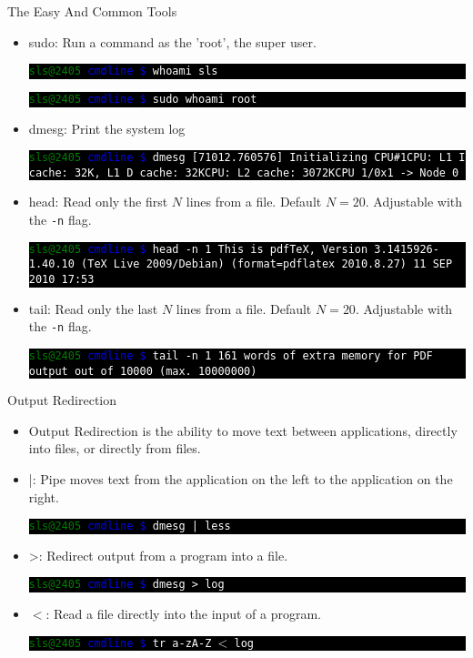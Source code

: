 \documentclass[10pt]{beamer}
\makeatletter
\newcommand{\codeblock}[1]
{
  \colorbox{black}{
    \begin{minipage}{\linewidth}
      \texttt{\textcolor{green}{sls@2405} \textcolor{blue}{cmdline \$} \textcolor{white}{#1}}
    \end{minipage}
  }
}
\newcommand{\codeblockWO}[2]
{
  \colorbox{black}{
    \begin{minipage}{\linewidth}
      \texttt{\textcolor{green}{sls@2405} \textcolor{blue}{cmdline \$} \textcolor{white}{#1}
      \newline
      \textcolor{white}{#2}}
    \end{minipage}
  }
}
\makeatother
\begin{document}
\begin{frame}[allowframebreaks]{The Easy And Common Tools}
\begin{itemize}
\item sudo: Run a command as the 'root', the super user.
\codeblockWO{whoami}{sls}
\codeblockWO{sudo whoami}{root}

\item dmesg: Print the system log
\codeblockWO{dmesg}{[71012.760576] Initializing CPU\#1\newline
[71012.760576] CPU: L1 I cache: 32K, L1 D cache: 32K\newline
[71012.760576] CPU: L2 cache: 3072K\newline
[71012.760576] CPU 1/0x1 -> Node 0}

\item head: Read only the first $N$ lines from a file. Default $N=20$. Adjustable with the \texttt{-n} flag.
\codeblockWO{head -n 1}{This is pdfTeX, Version 3.1415926-1.40.10 (TeX Live 2009/Debian) (format=pdflatex 2010.8.27)  11 SEP 2010 17:53}

\item tail: Read only the last $N$ lines from a file. Default $N=20$. Adjustable with the \texttt{-n} flag.
\codeblockWO{tail -n 1}{161 words of extra memory for PDF output out of 10000 (max. 10000000)}

\end{itemize}
\end{frame}

\begin{frame}{Output Redirection}
\begin{itemize}
\item Output Redirection is the ability to move text between applications, directly into files, or directly from files.

\item |: Pipe moves text from the application on the left to the application on the right.
\codeblock{dmesg | less}

\item >: Redirect output from a program into a file.
\codeblock{dmesg > log}

\item $<$: Read a file directly into the input of a program.
\codeblock{tr a-zA-Z $\texttt{<}$ log}
\end{itemize}
\end{frame}
\end{document}
